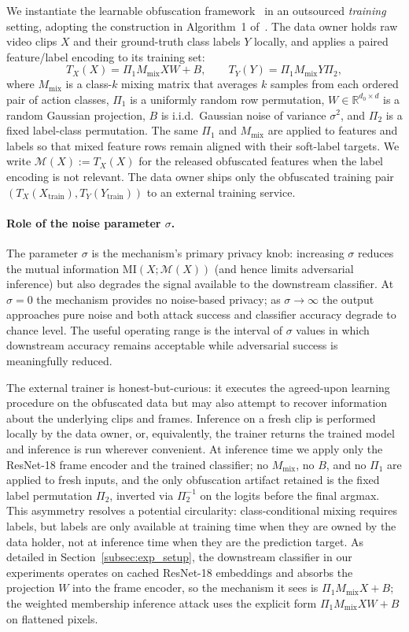 \documentclass[letterpaper]{article} %
\begin{document}
We instantiate the learnable obfuscation framework~\cite{xiao2024formal} in an outsourced \emph{training} setting, adopting the construction in Algorithm~1 of~\cite{xiao2024formal}. The data owner holds raw video clips $X$ and their ground-truth class labels $Y$ locally, and applies a paired feature/label encoding to its training set:
\[
T_X(X) = \Pi_1 M_{\mathrm{mix}} X W + B,
\qquad
T_Y(Y) = \Pi_1 M_{\mathrm{mix}} Y \Pi_2,
\]
where $M_{\mathrm{mix}}$ is a class-$k$ mixing matrix that averages $k$ samples from each ordered pair of action classes, $\Pi_1$ is a uniformly random row permutation, $W \in \mathbb{R}^{d_0 \times d}$ is a random Gaussian projection, $B$ is i.i.d.\ Gaussian noise of variance $\sigma^2$, and $\Pi_2$ is a fixed label-class permutation. The same $\Pi_1$ and $M_{\mathrm{mix}}$ are applied to features and labels so that mixed feature rows remain aligned with their soft-label targets. We write $\mathcal{M}(X) := T_X(X)$ for the released obfuscated features when the label encoding is not relevant. The data owner ships only the obfuscated training pair $(T_X(X_{\mathrm{train}}), T_Y(Y_{\mathrm{train}}))$ to an external training service.

\paragraph{Role of the noise parameter $\sigma$.}
The parameter $\sigma$ is the mechanism's primary privacy knob: increasing $\sigma$ reduces the mutual information $\mathrm{MI}(X; \mathcal{M}(X))$ (and hence limits adversarial inference) but also degrades the signal available to the downstream classifier. At $\sigma = 0$ the mechanism provides no noise-based privacy; as $\sigma \to \infty$ the output approaches pure noise and both attack success and classifier accuracy degrade to chance level. The useful operating range is the interval of $\sigma$ values in which downstream accuracy remains acceptable while adversarial success is meaningfully reduced.

The external trainer is honest-but-curious: it executes the agreed-upon learning procedure on the obfuscated data but may also attempt to recover information about the underlying clips and frames. Inference on a fresh clip is performed locally by the data owner, or, equivalently, the trainer returns the trained model and inference is run wherever convenient. At inference time we apply only the ResNet-18 frame encoder and the trained classifier; no $M_{\mathrm{mix}}$, no $B$, and no $\Pi_1$ are applied to fresh inputs, and the only obfuscation artifact retained is the fixed label permutation $\Pi_2$, inverted via $\Pi_2^{-1}$ on the logits before the final argmax. This asymmetry resolves a potential circularity: class-conditional mixing requires labels, but labels are only available at training time when they are owned by the data holder, not at inference time when they are the prediction target. As detailed in Section~\ref{subsec:exp_setup}, the downstream classifier in our experiments operates on cached ResNet-18 embeddings and absorbs the projection $W$ into the frame encoder, so the mechanism it sees is $\Pi_1 M_{\mathrm{mix}} X + B$; the weighted membership inference attack uses the explicit form $\Pi_1 M_{\mathrm{mix}} X W + B$ on flattened pixels.
\end{document}
